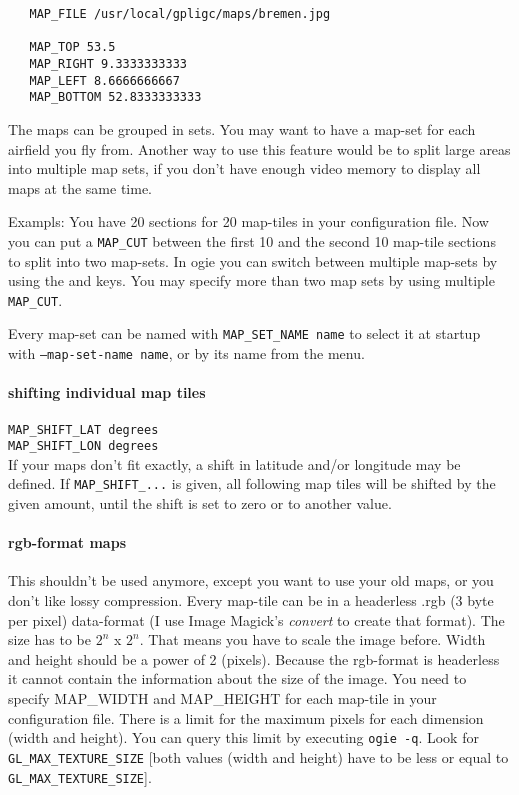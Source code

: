 \begin{verbatim}
   MAP_FILE /usr/local/gpligc/maps/bremen.jpg

   MAP_TOP 53.5
   MAP_RIGHT 9.3333333333
   MAP_LEFT 8.6666666667
   MAP_BOTTOM 52.8333333333
\end{verbatim}

The maps can be grouped in sets. You may want to have a map-set for each airfield you fly from.
Another way to use this feature would be to split large areas into multiple map sets, if you don't have enough video memory to display all maps at the same time.

Exampls: You have 20 sections for 20 map-tiles in your configuration file.
Now you can put a \texttt{MAP\_CUT} between the first 10 and the second 10
map-tile sections to split into two map-sets.
In ogie you can switch between multiple map-sets by using the  and  keys.
You may specify more than two map sets by using multiple \texttt{MAP\_CUT}.

Every map-set can be named with \texttt{MAP\_SET\_NAME name} to select it at startup with \texttt{--map-set-name name}, or by its name from the menu.


\paragraph{shifting individual map tiles}
$\,$ \\
\texttt{MAP\_SHIFT\_LAT  degrees} \\
\texttt{MAP\_SHIFT\_LON  degrees} \\
If your maps don't fit exactly, a shift in latitude and/or longitude may be defined.
If  \texttt{MAP\_SHIFT\_...} is given, all following map tiles will be shifted by the given amount, until the shift
is set to zero or to another value.


\paragraph{rgb-format maps}
This shouldn't be used anymore, except you want to use your old maps,
or you don't like lossy compression.
Every map-tile can be in a headerless .rgb (3 byte per pixel) data-format (I
use Image Magick's \emph{convert} to create that format). The size has to
be $2^n$ x $2^n$. That means   you have to scale the image before. Width and height
should be a power of 2 (pixels).
Because the rgb-format is headerless it cannot contain the information about the size
of the image. You need to specify MAP\_WIDTH and MAP\_HEIGHT for each map-tile in your
configuration file.
There is a limit for the maximum pixels for each dimension (width and height).
You can query this limit by executing \texttt{ogie -q}.
Look for \texttt{GL\_MAX\_TEXTURE\_SIZE} [both values (width and height) have to be less or equal
to \texttt{GL\_MAX\_TEXTURE\_SIZE}].

